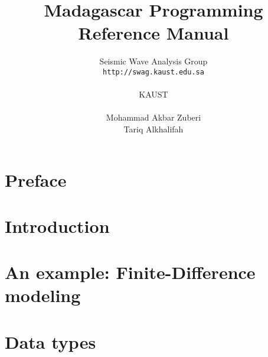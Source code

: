 %
%


\title{Madagascar Programming Reference Manual}
\author{Seismic Wave Analysis Group\\
               \texttt{http://swag.kaust.edu.sa}\\
               \\KAUST\\
               \\
               Mohammad Akbar Zuberi\\
               Tariq Alkhalifah}
\date{}   






\maketitle
\cleardoublepage

\tableofcontents{}
\cleardoublepage

\chapter*{Preface}


\chapter{Introduction}


\chapter{An example: Finite-Difference modeling}



\chapter{Data types}\label{sec:datatypes}
  


